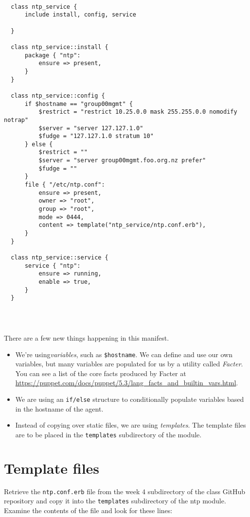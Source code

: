 \documentclass{article}   	%
\begin{document}
\begin{verbatim}

  class ntp_service {
      include install, config, service

  }

  class ntp_service::install {
      package { "ntp":
          ensure => present,
      }
  }

  class ntp_service::config {
      if $hostname == "group00mgmt" {
          $restrict = "restrict 10.25.0.0 mask 255.255.0.0 nomodify notrap"
          $server = "server 127.127.1.0"
          $fudge = "127.127.1.0 stratum 10"
      } else {
          $restrict = ""
          $server = "server group00mgmt.foo.org.nz prefer"
          $fudge = ""
      }
      file { "/etc/ntp.conf":
          ensure => present,
          owner => "root",
          group => "root",
          mode => 0444,
          content => template("ntp_service/ntp.conf.erb"),
      }    
  }

  class ntp_service::service {
      service { "ntp":
          ensure => running,
          enable => true,
      }    
  }


  
\end{verbatim}



There are a few new things happening in this manifest.
\begin{itemize}
  \item We're using\emph{variables}, such as \texttt{\$hostname}.  We can define and use our own variables, but many variables are populated for us by a utility called \emph{Facter}.  You can see a list of the core facts produced by Facter at \url{https://puppet.com/docs/puppet/5.3/lang_facts_and_builtin_vars.html}.
  \item We are using an \texttt{if/else} structure to conditionally populate variables based in the hostname of the agent.
  \item Instead of copying over static files, we are using \emph{templates}.  The template files are to be placed in the \texttt{templates} subdirectory of the module.
\end{itemize}

\section{Template files}
Retrieve the \texttt{ntp.conf.erb} file from the week 4 subdirectory of the class GitHub repository and copy it into the \texttt{templates} subdirectory of the ntp module. Examine the contents of the file and look for these lines:
\end{document}
